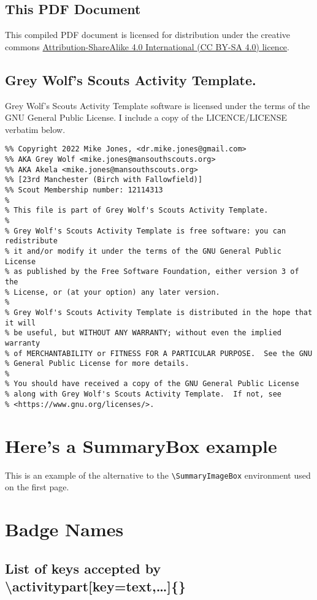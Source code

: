 \documentclass[a4paper]{GreyWolfsScoutActivityTemplate}
\begin{document}
\subsection*{This PDF Document}
This compiled PDF document is licensed for distribution under the creative commons \href{https://creativecommons.org/licenses/by-sa/4.0/}{Attribution-ShareAlike 4.0 International (CC BY-SA 4.0) licence}.

\subsection*{Grey Wolf's Scouts Activity Template.}
Grey Wolf's Scouts Activity Template software is licensed under the terms of the GNU General Public License. I include a copy of the LICENCE/LICENSE verbatim below.  

\begin{verbatim}
%% Copyright 2022 Mike Jones, <dr.mike.jones@gmail.com>
%% AKA Grey Wolf <mike.jones@mansouthscouts.org>
%% AKA Akela <mike.jones@mansouthscouts.org>
%% [23rd Manchester (Birch with Fallowfield)]
%% Scout Membership number: 12114313
%
% This file is part of Grey Wolf's Scouts Activity Template.
%
% Grey Wolf's Scouts Activity Template is free software: you can redistribute
% it and/or modify it under the terms of the GNU General Public License 
% as published by the Free Software Foundation, either version 3 of the
% License, or (at your option) any later version.
%
% Grey Wolf's Scouts Activity Template is distributed in the hope that it will
% be useful, but WITHOUT ANY WARRANTY; without even the implied warranty
% of MERCHANTABILITY or FITNESS FOR A PARTICULAR PURPOSE.  See the GNU
% General Public License for more details.
%
% You should have received a copy of the GNU General Public License
% along with Grey Wolf's Scouts Activity Template.  If not, see 
% <https://www.gnu.org/licenses/>.
\end{verbatim}



\section*{Here's a SummaryBox example}
\begin{SummaryBox}
This is an example of the alternative to the {\tt \textbackslash{}SummaryImageBox} environment used on the first page.
\par \lipsum[1]
\SummaryBoxSep
\fleur[width=\textwidth,colour=ScoutPurple]
\par
\vspace{5mm}
\lipsum[2]
\end{SummaryBox}
\clearpage



\section{Badge Names}
\label{badges}
\subsection*{List of keys accepted by \textbackslash{}activitypart[key=text,\ldots]\{\}}
\vspace{-5mm}
\begin{multicols}{2}
\footnotesize
\badgelist
\end{multicols}
\end{document}
